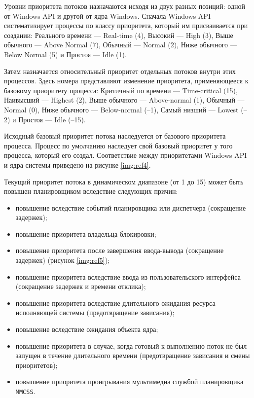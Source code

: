 \documentclass[a4paper,oneside,14pt]{extreport}
\begin{document}
Уровни приоритета потоков назначаются исходя из двух разных позиций:
одной от Windows API и другой от ядра Windows. 
Сначала Windows API систематизирует процессы по классу приоритета,
который им присваивается при создании: 
Реального времени — Real-time (4), Высокий — High (3),
Выше обычного — Above Normal (7), Обычный — Normal (2), Ниже обычного —
Below Normal (5) и Простоя — Idle (1).

Затем назначается относительный приоритет отдельных потоков внутри этих
процессов. Здесь номера представляют изменение приоритета, применяющееся
к базовому приоритету процесса: 
Критичный по времени — Time-critical (15),
Наивысший — Highest (2), Выше обычного — Above-normal (1), Обычный —
Normal (0), Ниже обычного — Below-normal (–1), Самый низший — Lowest (–2)
и Простоя — Idle (–15).

Исходный базовый приоритет потока наследуется от базового приоритета процесса. Процесс по умолчанию наследует свой базовый приоритет у
того процесса, который его создал.
Соответствие между приоритетами Windows API и ядра системы приведено
на рисунке \ref{img:ref4}.

\begin{figure}[ht!]
\end{figure}

\newpage
Текущий приоритет потока в динамическом диапазоне (от 1 до 15) может быть повышен планировщиком вследствие следующих причин:

\begin{itemize}
	\item повышение вследствие событий планировщика или диспетчера (сокращение
	задержек);
	\item повышение приоритета владельца блокировки;
	\item повышение приоритета после завершения ввода-вывода (сокращение задержек) (рисунок \ref{img:ref5});
	\item повышение приоритета вследствие ввода из пользовательского интерфейса (сокращение
	задержек и времени отклика);
	\item повышение приоритета вследствие длительного ожидания ресурса исполняющей системы (предотвращение зависания);
	\item повышение вследствие ожидания объекта ядра;
	\item повышение приоритета в случае, когда готовый к выполнению поток не был запущен в течение длительного времени (предотвращение зависания и смены приоритетов);
	\item повышение приоритета проигрывания мультимедиа службой планировщика \texttt{MMCSS}.
\end{itemize}
\end{document}
